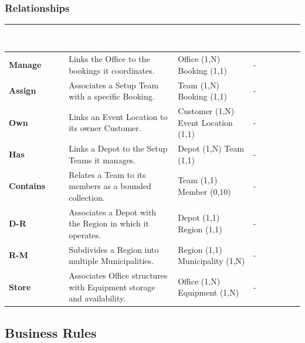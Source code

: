 \documentclass[12pt,a4paper]{article}
\begin{document}
\subsubsection*{Relationships}
\begin{center}
\renewcommand{\arraystretch}{1.5}
\small
\begin{tabular}{|p{}|p{}|p{}|p{}|}
\hline
\rowcolor[rgb]{0.1, 0.3, 0.5} 
\textcolor{white}{\textbf{Relationship}} & \textcolor{white}{\textbf{Description}} & \textcolor{white}{\textbf{Entities Involved}} & \textcolor{white}{\textbf{Attributes}} \\ \hline
\textbf{Manage} & Links the Office to the bookings it coordinates. & Office (1,N) \newline Booking (1,1) & - \\ \hline
\textbf{Assign} & Associates a Setup Team with a specific Booking. & Team (1,N) \newline Booking (1,1) & - \\ \hline
\textbf{Own} & Links an Event Location to its owner Customer. & Customer (1,N) \newline Event Location (1,1) & - \\ \hline
\textbf{Has} & Links a Depot to the Setup Teams it manages. & Depot (1,N) \newline Team (1,1) & - \\ \hline
\textbf{Contains} & Relates a Team to its members as a bounded collection. & Team (1,1) \newline Member (0,10) & - \\ \hline
\textbf{D-R} & Associates a Depot with the Region in which it operates. & Depot (1,1) \newline Region (1,1) & - \\ \hline
\textbf{R-M} & Subdivides a Region into multiple Municipalities. & Region (1,1) \newline Municipality (1,N) & - \\ \hline
\textbf{Store} & Associates Office structures with Equipment storage and availability. & Office (1,N) \newline Equipment (1,N) & - \\ \hline
\end{tabular}
\end{center}

\subsection{Business Rules}
\end{document}
